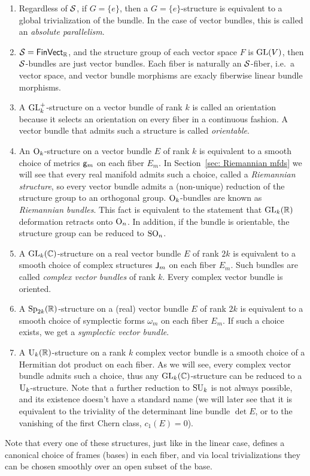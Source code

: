 \begin{example}
    \begin{enumerate}
        \item Regardless of $\mathcal{S}$, if $G=\{e\}$, then a $G=\{e\}$-structure is equivalent to a global trivialization of the bundle. In the case of vector bundles, this is called an \emph{absolute parallelism}.
        \item $\mathcal{S}=\mathsf{FinVect}_{\mathbb{R}}$, and the structure group of each vector space $F$ is $\operatorname{GL}(V)$, then $\mathcal{S}$-bundles are just vector bundles. Each fiber is naturally an $\mathcal{S}$-fiber, i.e.\ a vector space, and vector bundle morphisms are exacly fiberwise linear bundle morphisms.
        \item A $\operatorname{GL}_k^+$-structure on a vector bundle of rank $k$ is called an orientation because it selects an orientation on every fiber in a continuous fashion. A vector bundle that admits such a structure is called \emph{orientable}.
        \item An $\operatorname{O}_k$-structure on a vector bundle $E$ of rank $k$ is equivalent to a smooth choice of metrics $\mathsf{g}_m$ on each fiber $E_m$. In Section~\ref{sec: Riemannian mfds} we will see that every real manifold admits such a choice, called a \emph{Riemannian structure}, so every vector bundle admits a (non-unique) reduction of the structure group to an orthogonal group. $\operatorname{O}_k$-bundles are known as \emph{Riemannian bundles}. This fact is equivalent to the statement that $\operatorname{GL}_k(\mathbb{R})$ deformation retracts onto $\operatorname{O}_n$. In addition, if the bundle is orientable, the structure group can be reduced to $\operatorname{SO}_n$.
        \item A $\operatorname{GL}_k(\mathbb{C})$-structure on a real vector bundle $E$ of rank $2k$ is equivalent to a smooth choice of complex structures $\mathsf{J}_m$ on each fiber $E_m$. Such bundles are called \emph{complex vector bundles} of rank $k$. Every complex vector bundle is oriented.
        \item A $\operatorname{Sp}_{2k}(\mathbb{R})$-structure on a (real) vector bundle $E$ of rank $2k$ is equivalent to a smooth choice of symplectic forms $\omega_m$ on each fiber $E_m$. If such a choice exists, we get a \emph{symplectic vector bundle}.
        \item A $\operatorname{U}_k(\mathbb{R})$-structure on a rank $k$ complex vector bundle is a smooth choice of a Hermitian dot product on each fiber. As we will see, every complex vector bundle admits such a choice, thus any $\operatorname{GL}_k(\mathbb{C})$-structure can be reduced to a $\operatorname{U}_k$-structure. Note that a further reduction to $\operatorname{SU}_k$ is not always possible, and its existence doesn't have a standard name (we will later see that it is equivalent to the triviality of the determinant line bundle $\det E$, or to the vanishing of the first Chern class, $c_1(E)=0$).
    \end{enumerate}
    Note that every one of these structures, just like in the linear case, defines a canonical choice of frames (bases) in each fiber, and via local trivializations they can be chosen smoothly over an open subset of the base. 
\end{example}

